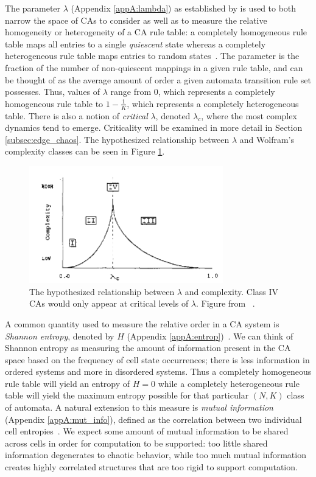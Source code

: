 \documentclass[a4paper,11pt]{article}
\begin{document}
\medskip
The parameter $\lambda$ (Appendix \ref{appA:lambda}) as established by \citeauthor{la90} is used to both narrow the space of CAs to consider as well as to measure the relative homogeneity or heterogeneity of a CA rule table: a completely homogeneous rule table maps all entries to a single \textit{quiescent} state whereas a completely heterogeneous rule table maps entries to random states~\cite{la90}. The parameter is the fraction of the number of non-quiescent mappings in a given rule table, and can be thought of as the average amount of order a given automata transition rule set possesses. Thus, values of $\lambda$ range from $0$, which represents a completely homogeneous rule table to $1 - \frac{1}{K}$, which represents a completely heterogeneous table. There is also a notion of \textit{critical} $\lambda$, denoted $\lambda_c$, where the most complex dynamics tend to emerge. Criticality will be examined in more detail in Section \ref{subsec:edge_chaos}. The hypothesized relationship between $\lambda$ and Wolfram's complexity classes can be seen in Figure \ref{fig:wolfram}.

\begin{figure}[htp]
	\centering
	\includegraphics[width=0.75\textwidth]{la90_fig16_wolfram_classes.png}
	\caption[Wolfram's Complexity Classes]{
	The hypothesized relationship between $\lambda$ and complexity. Class IV CAs would only appear at critical levels of $\lambda$. Figure from \citeauthor{la90}~\cite{la90}.
	}
	\label{fig:wolfram}
\end{figure}

\medskip

A common quantity used to measure the relative order in a CA system is \textit{Shannon entropy}, denoted by $H$ (Appendix \ref{appA:entrop})~\cite{la90,li90a,wo90}. We can think of Shannon entropy as measuring the amount of information present in the CA space based on the frequency of cell state occurrences; there is less information in ordered systems and more in disordered systems. Thus a completely homogeneous rule table will yield an entropy of $H = 0$ while a completely heterogeneous rule table will yield the maximum entropy possible for that particular $(N,K)$ class of automata. A natural extension to this measure is \textit{mutual information} (Appendix \ref{appA:mut_info}), defined as the correlation between two individual cell entropies~\cite{la90}. We expect some amount of mutual information to be shared across cells in order for computation to be supported: too little shared information degenerates to chaotic behavior, while too much mutual information creates highly correlated structures that are too rigid to support computation.
\end{document}

